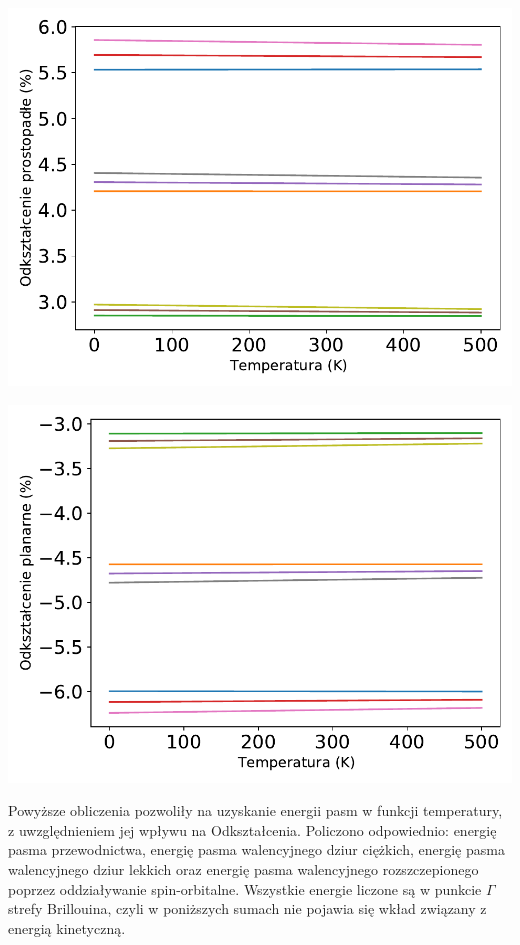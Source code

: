 \documentclass[12pt,openany,a4paper]{book}
\begin{document}
\begin{minipage}[t]{0.5\textwidth}
	\includegraphics[width = 0.9\linewidth]{Figures/strain/eps_orth2.pdf}\label{fig:eps_orth2}
\end{minipage}
\begin{minipage}[t]{0.5\textwidth}
	\includegraphics[width = 0.9\linewidth]{Figures/strain/eps_par2.pdf}\label{fig:eps_par2}
\end{minipage}
\begin{center}
\end{center}

Powyższe obliczenia pozwoliły na uzyskanie energii pasm w funkcji temperatury, z uwzględnieniem jej
wpływu na Odkształcenia. Policzono odpowiednio: energię pasma przewodnictwa, energię pasma walencyjnego
dziur ciężkich, energię pasma walencyjnego dziur lekkich oraz energię pasma walencyjnego rozszczepionego
poprzez oddziaływanie spin-orbitalne. Wszystkie energie liczone są w punkcie \(\Gamma\)
strefy Brillouina, czyli w poniższych sumach nie pojawia się wkład związany z energią kinetyczną.
\end{document}
